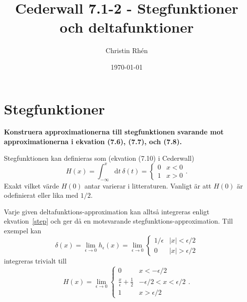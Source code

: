 \documentclass[reprint,
 amsmath,amssymb,
 aps,prl
]{revtex4-1}
\begin{document}

\author{Christin Rh\'en}
\title{Cederwall 7.1-2 - Stegfunktioner och deltafunktioner}
\date{\today}


\maketitle

\section{Stegfunktioner}
\textbf{Konstruera approximationerna till stegfunktionen svarande mot approximationerna i ekvation (7.6), (7.7), och (7.8).}

\phantom{o}

Stegfunktionen kan definieras som (ekvation (7.10) i Cederwall)
\begin{equation}
    H(x) =\int_{-\infty}^x\mathrm dt\ \delta(t)=\left\{\begin{array}{cc}
        0 & x < 0 \\
        1 & x > 0
    \end{array} \right..
    \label{step}
\end{equation}
Exakt vilket värde $H(0)$ antar varierar i litteraturen. Vanligt är att $H(0)$ är odefinierat eller lika med $1/2$. 

Varje given deltafunktions-approximation kan alltså integreras enligt ekvation~\eqref{step} och ger då en motsvarande stegfunktions-approximation. Till exempel kan
\begin{equation}
    \delta(x)=\lim_{\epsilon\rightarrow 0}h_\epsilon(x) =\lim_{\epsilon\rightarrow 0}\left\{\begin{array}{cc}
        1/\epsilon & |x| < \epsilon/2 \\
        0 & |x| > \epsilon/2
    \end{array} \right.
\end{equation}
integreras trivialt till 
\begin{equation}
    H(x)=\lim_{\epsilon\rightarrow 0}\left\{\begin{array}{cc}
        0 & x < -\epsilon/2 \\
        \tfrac x\epsilon+\tfrac12 & -\epsilon/2<x<\epsilon/2 \\
        1 & x > \epsilon/2
    \end{array} \right..
\end{equation}
\end{document}
